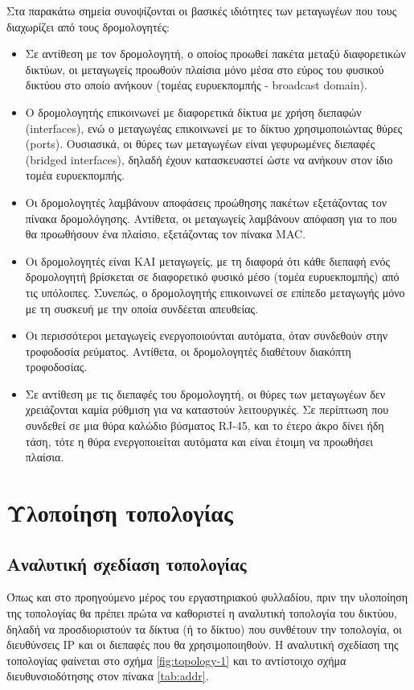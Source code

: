 \documentclass{EdipyLabs} %
\begin{document}
Στα παρακάτω σημεία συνοψίζονται οι βασικές ιδιότητες των μεταγωγέων που τους διαχωρίζει από τους δρομολογητές:
\begin{itemize}
	\item Σε αντίθεση με τον δρομολογητή, ο οποίος προωθεί πακέτα μεταξύ διαφορετικών δικτύων, οι μεταγωγείς προωθούν πλαίσια μόνο μέσα στο εύρος του φυσικού δικτύου στο οποίο ανήκουν (τομέας ευρυεκπομπής - broadcast domain).
	\item Ο δρομολογητής επικοινωνεί με διαφορετικά δίκτυα με χρήση διεπαφών (interfaces), ενώ ο μεταγωγέας επικοινωνεί με το δίκτυο χρησιμοποιώντας θύρες (ports). Ουσιασικά, οι θύρες των μεταγωγέων είναι γεφυρωμένες διεπαφές (bridged interfaces), δηλαδή έχουν κατασκευαστεί ώστε να ανήκουν στον ίδιο τομέα ευρυεκπομπής.
	\item Οι δρομολογητές λαμβάνουν αποφάσεις προώθησης πακέτων εξετάζοντας τον πίνακα δρομολόγησης. Αντίθετα, οι μεταγωγείς λαμβάνουν απόφαση για το που θα προωθήσουν ένα πλαίσιο, εξετάζοντας τον πίνακα MAC.
	\item Οι δρομολογητές είναι ΚΑΙ μεταγωγείς, με τη διαφορά ότι κάθε διεπαφή ενός δρομολογητή βρίσκεται σε διαφορετικό φυσικό μέσο (τομέα ευρυεκπομπής) από τις υπόλοιπες. Συνεπώς, ο δρομολογητής επικοινωνεί σε επίπεδο μεταγωγής μόνο με τη συσκευή με την οποία συνδέεται απευθείας.
	\item Οι περισσότεροι μεταγωγείς ενεργοποιούνται αυτόματα, όταν συνδεθούν στην τροφοδοσία ρεύματος. Αντίθετα, οι δρομολογητές διαθέτουν διακόπτη τροφοδοσίας. 
	\item Σε αντίθεση με τις διεπαφές του δρομολογητή, οι θύρες των μεταγωγέων δεν χρειάζονται καμία ρύθμιση για να καταστούν λειτουργικές. Σε περίπτωση που συνδεθεί σε μια θύρα καλώδιο βύσματος RJ-45, και το έτερο άκρο δίνει ήδη τάση, τότε η θύρα ενεργοποιείται αυτόματα και είναι έτοιμη να προωθήσει πλαίσια. 
\end{itemize} 
  \newpage
  
\section{Υλοποίηση τοπολογίας}

\subsection{Αναλυτική σχεδίαση τοπολογίας}
Όπως και στο προηγούμενο μέρος του εργαστηριακού φυλλαδίου, πριν την υλοποίηση της τοπολογίας θα πρέπει πρώτα να καθοριστεί η αναλυτική τοπολογία του δικτύου, δηλαδή να προσδιοριστούν τα δίκτυα (ή το δίκτυο) που συνθέτουν την τοπολογία, οι διευθύνσεις IP και οι διεπαφές που θα χρησιμοποιηθούν. Η αναλυτική σχεδίαση της τοπολογίας φαίνεται στο σχήμα \ref{fig:topology-1} και το αντίστοιχο σχήμα διευθυνσιοδότησης στον πίνακα \ref{tab:addr}.
\end{document}
